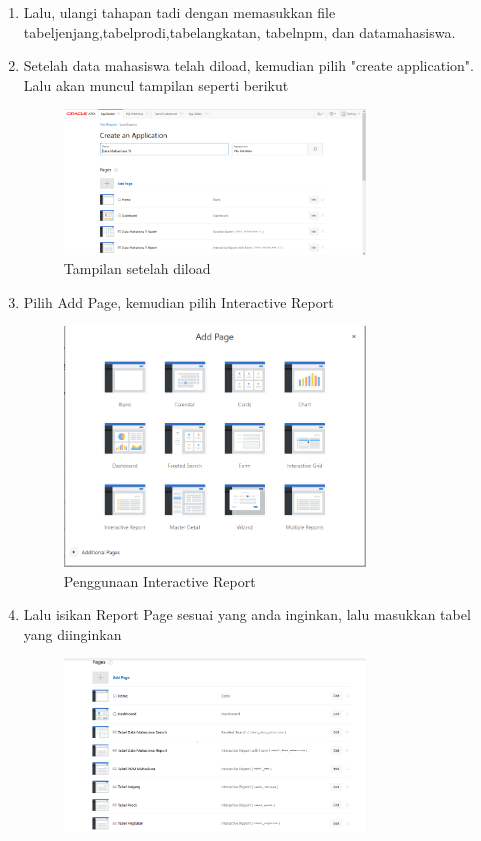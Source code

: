 \begin{enumerate}
\begin{figure}[H]
				\end{figure}
	\item Lalu, ulangi tahapan tadi dengan memasukkan file tabeljenjang,tabelprodi,tabelangkatan, tabelnpm, dan datamahasiswa.
	\item Setelah data mahasiswa telah diload, kemudian pilih "create application". Lalu akan muncul tampilan seperti berikut
				\begin{figure}[H]
				\includegraphics[width=8cm]{figures/createap.png}
				\centering
				\caption{Tampilan setelah diload}
				\end{figure}
	\item Pilih Add Page, kemudian pilih Interactive Report
		\begin{figure}[H]
				\includegraphics[width=8cm]{figures/addpage.png}
				\centering
				\caption{Penggunaan Interactive Report}
				\end{figure}
	\item Lalu isikan Report Page sesuai yang anda inginkan, lalu masukkan tabel yang diinginkan
				\begin{figure}[H]
				\includegraphics[width=8cm]{figures/addpage2.png}

\end{figure}
\end{enumerate}
